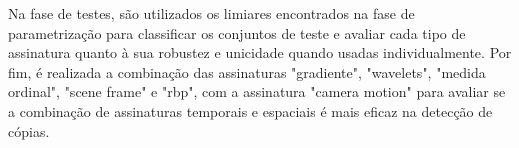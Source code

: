 Na fase de testes, são utilizados os limiares encontrados na fase de parametrização para classificar os conjuntos de teste e avaliar cada tipo de assinatura quanto à sua robustez e unicidade quando usadas individualmente. Por fim, é realizada a combinação das assinaturas "gradiente", "wavelets", "medida ordinal", "scene frame" e "rbp", com a assinatura "camera motion" para avaliar se a combinação de assinaturas temporais e espaciais é mais eficaz na detecção de cópias.
